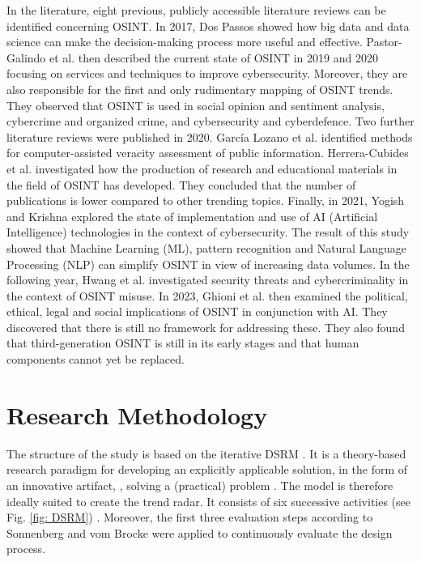 \documentclass[10pt]{article}
\begin{document}
In the literature, eight previous, publicly accessible literature reviews can be identified
concerning OSINT. In 2017, Dos Passos \cite{DosPassos.2017} showed how big data and data science can
make the decision-making process more useful and effective. Pastor-Galindo et al. then described
the current state of OSINT in 2019 \cite{PastorGalindo.2019} and 2020 \cite{PastorGalindo.2020}
focusing on services and techniques to improve cybersecurity. Moreover, they are also responsible
for the first and only rudimentary mapping of OSINT trends. They observed that OSINT is used in
social opinion and sentiment analysis, cybercrime and organized crime, and cybersecurity and cyberdefence.
Two further literature reviews were published in 2020. García Lozano et al. \cite{GarciaLozano.2020} identified
methods for computer-assisted veracity assessment of public information.
Herrera-Cubides et al. \cite{HerreraCubides.2020} investigated how the production of
research and educational materials in the field of OSINT has developed. They concluded that
the number of publications is lower compared to other trending topics. Finally, in 2021,
Yogish and Krishna \cite{Yogish.2021} explored the state of implementation and use of AI
(Artificial Intelligence) technologies in the context of cybersecurity. The result of this
study showed that Machine Learning (ML), pattern recognition and Natural Language Processing
(NLP) can simplify OSINT in view of increasing data volumes. In the following year, Hwang et al.
\cite{Hwang.2022} investigated security threats and cybercriminality in the context of OSINT misuse.
In 2023, Ghioni et al. \cite{Ghioni.2023} then examined the political, ethical, legal and social implications of
OSINT in conjunction with AI. They discovered that there is still no framework
for addressing these. They also found that third-generation OSINT is still in its early
stages and that human components cannot yet be replaced.

\section{Research Methodology}

The structure of the study is based on the iterative DSRM \cite{Peffers.2007}. It is a theory-based
research paradigm for developing an explicitly applicable solution, in the form of an innovative artifact,
\cite{vomBrocke.2020b}, solving a (practical) problem \cite{Peffers.2007,Hevner.2004}. The model is therefore ideally suited to
create the trend radar. It consists of six successive activities (see Fig. \ref{fig: DSRM}) \cite{Peffers.2007}.
Moreover, the first three evaluation steps according to Sonnenberg and vom Brocke \cite{Sonnenberg.2012}
were applied to continuously evaluate the design process.
\end{document}
